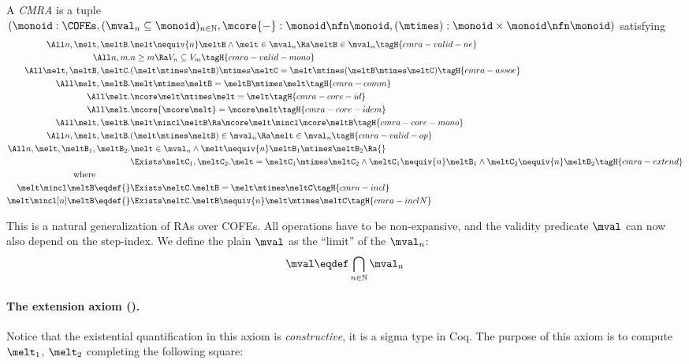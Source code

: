 \begin{defn}
  A \emph{CMRA} is a tuple $(\monoid : \COFEs, (\mval_n \subseteq \monoid)_{n \in \mathbb{N}}, \mcore{-}: \monoid \nfn \monoid, (\mtimes) : \monoid \times \monoid \nfn \monoid)$ satisfying
  \begin{align*}
    \All n, \melt, \meltB.& \melt \nequiv{n} \meltB \land \melt\in\mval_n \Ra \meltB\in\mval_n \tagH{cmra-valid-ne} \\
    \All n, m.& n \geq m \Ra V_n \subseteq V_m \tagH{cmra-valid-mono} \\
    \All \melt, \meltB, \meltC.& (\melt \mtimes \meltB) \mtimes \meltC = \melt \mtimes (\meltB \mtimes \meltC) \tagH{cmra-assoc} \\
    \All \melt, \meltB.& \melt \mtimes \meltB = \meltB \mtimes \melt \tagH{cmra-comm} \\
    \All \melt.& \mcore\melt \mtimes \melt = \melt \tagH{cmra-core-id} \\
    \All \melt.& \mcore{\mcore\melt} = \mcore\melt \tagH{cmra-core-idem} \\
    \All \melt, \meltB.& \melt \mincl \meltB \Ra \mcore\melt \mincl \mcore\meltB \tagH{cmra-core-mono} \\
    \All n, \melt, \meltB.& (\melt \mtimes \meltB) \in \mval_n \Ra \melt \in \mval_n \tagH{cmra-valid-op} \\
    \All n, \melt, \meltB_1, \meltB_2.& \omit\rlap{$\melt \in \mval_n \land \melt \nequiv{n} \meltB_1 \mtimes \meltB_2 \Ra {}$} \\
    &\Exists \meltC_1, \meltC_2. \melt = \meltC_1 \mtimes \meltC_2 \land \meltC_1 \nequiv{n} \meltB_1 \land \meltC_2 \nequiv{n} \meltB_2 \tagH{cmra-extend} \\
    \text{where}\qquad\qquad\\
    \melt \mincl \meltB \eqdef{}& \Exists \meltC. \meltB = \melt \mtimes \meltC \tagH{cmra-incl}\\
    \melt \mincl[n] \meltB \eqdef{}& \Exists \meltC. \meltB \nequiv{n} \melt \mtimes \meltC \tagH{cmra-inclN}
  \end{align*}
\end{defn}

This is a natural generalization of RAs over COFEs.
All operations have to be non-expansive, and the validity predicate $\mval$ can now also depend on the step-index.
We define the plain $\mval$ as the ``limit'' of the $\mval_n$:
\[ \mval \eqdef \bigcap_{n \in \mathbb{N}} \mval_n \]

\paragraph{The extension axiom ().}
Notice that the existential quantification in this axiom is \emph{constructive}, \ie it is a sigma type in Coq.
The purpose of this axiom is to compute $\melt_1$, $\melt_2$ completing the following square:

